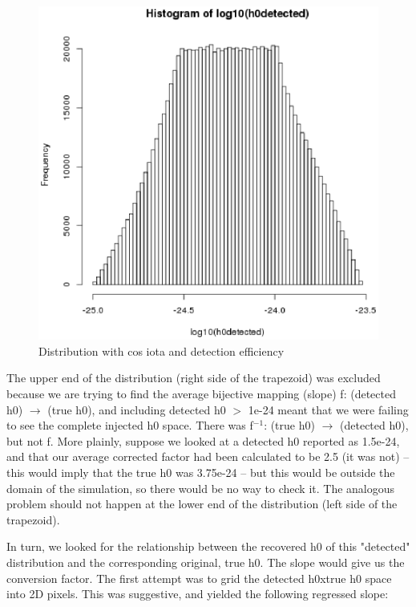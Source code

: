 \begin{figure}
\begin{center}
\includegraphics[width=0.3\paperwidth,height=0.2\paperheight]{PlotHEffDistH0Detected.eps}
\caption{Distribution with cos iota and detection efficiency
}
\end{center}
\end{figure}


The upper end of the distribution (right side of the trapezoid) was excluded because we are trying to find the average bijective mapping (slope) f: (detected h0) $\rightarrow$ (true h0), and including detected h0 $>$ 1e-24 meant that we were failing to see the complete injected h0 space. There was f$^{-1}$: (true h0) $\rightarrow$ (detected h0), but not f. More plainly, suppose we looked at a detected h0 reported as 1.5e-24, and that our average corrected factor had been calculated to be 2.5 (it was not) -- this would imply that the true h0 was 3.75e-24 -- but this would be outside the domain of the simulation, so there would be no way to check it. The analogous problem should not happen at the lower end of the distribution (left side of the trapezoid).

In turn, we looked for the relationship between the recovered h0 of this "detected" distribution and the corresponding original, true h0. The slope would give us the conversion factor. The first attempt was to grid the {detected h0}x{true h0} space into 2D pixels. This was suggestive, and yielded the following regressed slope:

